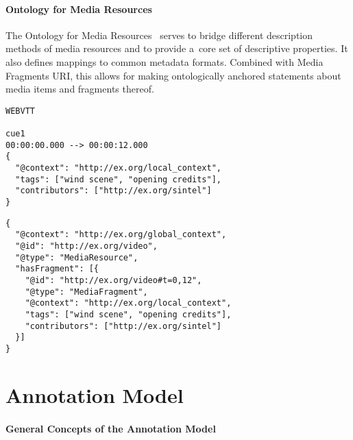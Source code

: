 \documentclass{sig-alternate}
\newcommand{\inlinelistingsize}{\fontsize{8pt}{11pt}}
\let\oldurl\url
\renewcommand{\url}[1]{\inlinelistingsize\oldurl{#1}}
\def\JSONLD{\mbox{JSON-LD}}
\begin{document}
\paragraph{Ontology for Media Resources}

The Ontology for Media Resources~\cite{lee2012mediaontology}
serves to bridge different description methods of media resources
and to provide a~core set of descriptive properties.
It also defines mappings to common metadata formats.
Combined with Media Fragments URI,
this allows for making ontologically anchored statements
about media items and fragments thereof.

\begin{lstlisting}[caption={Sample WebVTT metadata file},
  label=listing:webvtt, float=t!]
WEBVTT

cue1
00:00:00.000 --> 00:00:12.000
{
  "@context": "http://ex.org/local_context",
  "tags": ["wind scene", "opening credits"],
  "contributors": ["http://ex.org/sintel"]
}
\end{lstlisting}

\begin{lstlisting}[caption={Generated \JSONLD~for the Web of Data, see
    \url{http://bit.ly/webvtt-jsonld} for the RDF triples},
  label=listing:jsonld, float=t!]
{
  "@context": "http://ex.org/global_context",
  "@id": "http://ex.org/video",
  "@type": "MediaResource",
  "hasFragment": [{
    "@id": "http://ex.org/video#t=0,12",
    "@type": "MediaFragment",
    "@context": "http://ex.org/local_context",
    "tags": ["wind scene", "opening credits"],
    "contributors": ["http://ex.org/sintel"]
  }]
}
\end{lstlisting}

\section{Annotation Model}

\paragraph{General Concepts of the Annotation Model}
\end{document}
